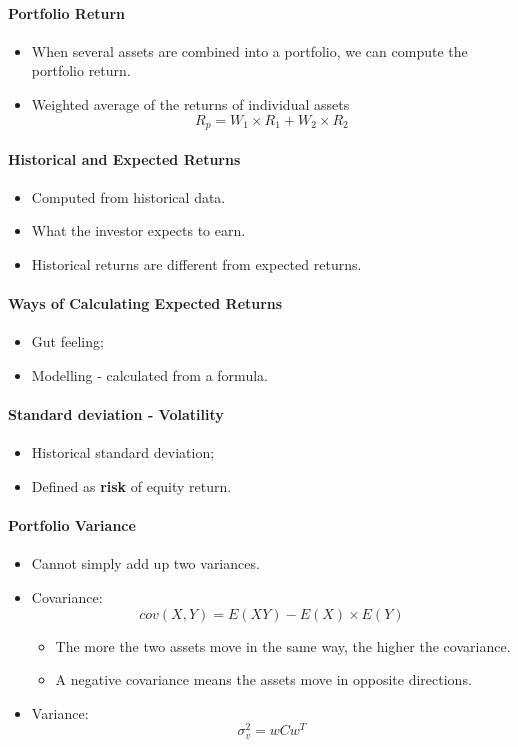 \documentclass[11pt,a4paper]{report}
\begin{document}
\paragraph{Portfolio Return}
\begin{itemize}
    \item When several assets are combined into a portfolio, we can compute the portfolio return.
    \item Weighted average of the returns of individual assets
    \[ R_p = W_1 \times R_1 + W_2 \times R_2\]
\end{itemize}
\paragraph{Historical and Expected Returns}
\begin{itemize}
    \item Computed from historical data.
    \item What the investor expects to earn.
    \item Historical returns are different from expected returns.
\end{itemize}

\paragraph{Ways of Calculating Expected Returns}
\begin{itemize}
    \item Gut feeling;
    \item Modelling - calculated from a formula.
\end{itemize}

\paragraph{Standard deviation - Volatility}
\begin{itemize}
    \item Historical standard deviation;
    \item Defined as \textbf{risk} of equity return.
\end{itemize}

\paragraph*{Portfolio Variance}
\begin{itemize}
    \item Cannot simply add up two variances.
    \item Covariance:
    \[cov(X,Y) = E(XY) - E(X) \times E(Y)\]
    \begin{itemize}
        \item The more the two assets move in the same way, the higher the covariance.
        \item A negative covariance means the assets move in opposite directions.
    \end{itemize}
    \item Variance:
    \[ \sigma_v^2 = wCw^T \]
\end{itemize}
\end{document}
